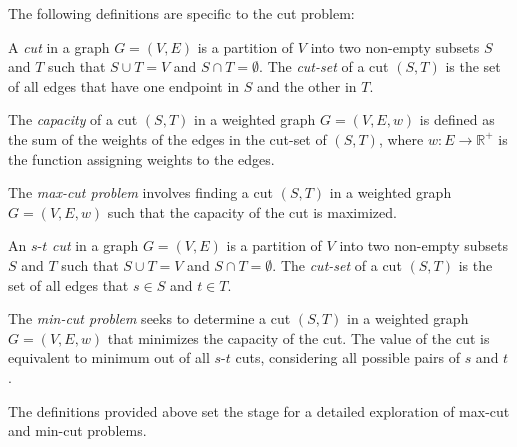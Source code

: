 \noindent
The following definitions are specific to the cut problem:

\begin{definition}[cut]
    \label{def:cut}
    A \emph{cut} in a graph \( G = (V, E) \) is a partition of \( V \) into two non-empty subsets \( S \) and \( T \) such that \( S \cup T = V \) and \( S \cap T = \emptyset \). The \emph{cut-set} of a cut \( (S, T) \) is the set of all edges that have one endpoint in \( S \) and the other in \( T \).
\end{definition}

\begin{definition}
    \label{def:capacityCut}
    The \emph{capacity} of a cut \( (S, T) \) in a weighted graph \( G = (V, E, w) \) is defined as the sum of the weights of the edges in the cut-set of \( (S, T) \), where \( w: E \rightarrow \mathbb{R}^+ \) is the function assigning weights to the edges.
\end{definition}

\begin{definition}
    \label{def:maxCut}
    The \emph{max-cut problem} involves finding a cut \( (S, T) \) in a weighted graph \( G = (V, E, w) \) such that the capacity of the cut is maximized.
\end{definition}

\begin{definition}[\( s \)-\( t \) cut]
An \(s\)-\(t\) \emph{cut} in a graph \( G = (V, E) \) is a partition of \( V \) into two non-empty subsets \( S \) and \( T \) such that \( S \cup T = V \) and \( S \cap T = \emptyset \). The \emph{cut-set} of a cut \( (S, T) \) is the set of all edges that \(s \in S \) and \(t \in T \).
    
\end{definition}

\begin{definition}
    \label{def:minCut}
    The \emph{min-cut problem} seeks to determine a cut \( (S, T) \) in a weighted graph \( G = (V, E, w) \) that minimizes the capacity of the cut. The value of the cut is equivalent to minimum out of all \( s \)-\( t \) cuts, considering all possible pairs of \( s \) and \( t \).
\end{definition}
The definitions provided above set the stage for a detailed exploration of max-cut and min-cut problems.
